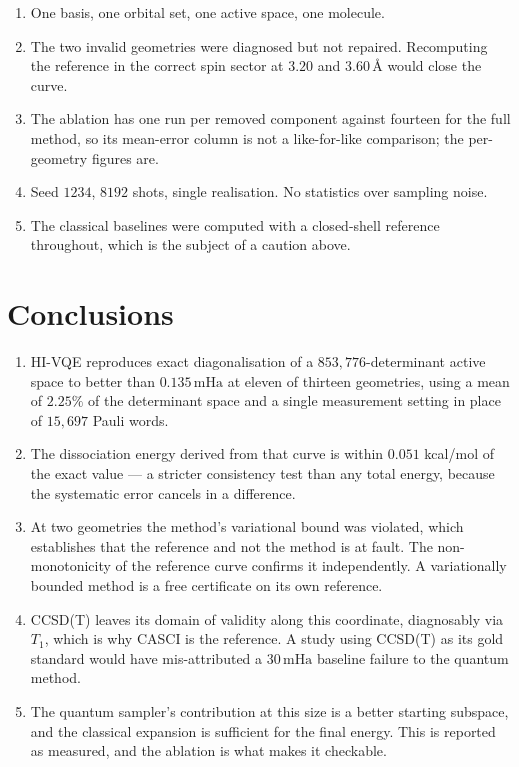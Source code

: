 \documentclass[11pt,a4paper]{article}
\newcommand{\mHa}{\ensuremath{\,\mathrm{mHa}}}
\newcommand{\Ang}{\ensuremath{\,\text{\AA}}}
\begin{document}
\begin{enumerate}[leftmargin=1.4em,itemsep=0.2em]
\item One basis, one orbital set, one active space, one molecule.
\item The two invalid geometries were diagnosed but not repaired. Recomputing
  the reference in the correct spin sector at $3.20$ and $3.60\Ang$ would close
  the curve.
\item The ablation has one run per removed component against fourteen for the
  full method, so its mean-error column is not a like-for-like comparison; the
  per-geometry figures are.
\item Seed $1234$, $8192$ shots, single realisation. No statistics over sampling
  noise.
\item The classical baselines were computed with a closed-shell reference
  throughout, which is the subject of a caution above.
\end{enumerate}

\section{Conclusions}

\sloppy
\begin{enumerate}[leftmargin=1.4em,itemsep=0.25em]

\item HI-VQE reproduces exact diagonalisation of a $853{,}776$-determinant
  active space to better than $0.135\mHa$ at eleven of thirteen geometries,
  using a mean of $2.25\%$ of the determinant space and a single measurement
  setting in place of $15{,}697$ Pauli words.

\item The dissociation energy derived from that curve is within $0.051$
  kcal/mol of the exact value --- a stricter consistency test than any total
  energy, because the systematic error cancels in a difference.

\item At two geometries the method's variational bound was violated, which
  establishes that the reference and not the method is at fault. The
  non-monotonicity of the reference curve confirms it independently. A
  variationally bounded method is a free certificate on its own reference.

\item CCSD(T) leaves its domain of validity along this coordinate, diagnosably
  via $T_1$, which is why CASCI is the reference. A study using CCSD(T) as its
  gold standard would have mis-attributed a $30\mHa$ baseline failure to the
  quantum method.

\item The quantum sampler's contribution at this size is a better starting
  subspace, and the classical expansion is sufficient for the final energy. This
  is reported as measured, and the ablation is what makes it checkable.

\end{enumerate}
\fussy
\end{document}
